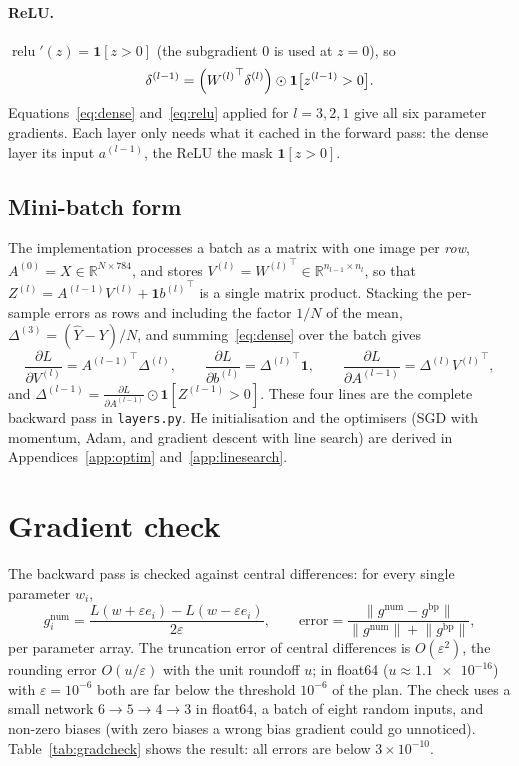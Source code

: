 \documentclass[11pt,a4paper]{article}
\newcommand{\R}{\mathbb{R}}
\newcommand{\1}{\mathbf{1}}
\begin{document}
\paragraph{ReLU.} $\operatorname{relu}'(z) = \1[z > 0]$ (the subgradient $0$ is used at
$z = 0$), so
\begin{equation}
  \delta^{(l-1)} = \Bigl({W^{(l)}}^{\top} \delta^{(l)}\Bigr) \odot \1\bigl[z^{(l-1)} > 0\bigr].
  \label{eq:relu}
\end{equation}
Equations~\eqref{eq:dense} and~\eqref{eq:relu} applied for $l = 3, 2, 1$ give all six parameter
gradients. Each layer only needs what it cached in the forward pass: the dense layer its input
$a^{(l-1)}$, the ReLU the mask $\1[z > 0]$.

\subsection{Mini-batch form}
The implementation processes a batch as a matrix with one image per \emph{row},
$A^{(0)} = X \in \R^{N \times 784}$, and stores $V^{(l)} = {W^{(l)}}^{\top} \in
\R^{n_{l-1} \times n_l}$, so that $Z^{(l)} = A^{(l-1)} V^{(l)} + \1 {b^{(l)}}^{\top}$ is a single
matrix product. Stacking the per-sample errors as rows and including the factor $1/N$ of the mean,
$\Delta^{(3)} = (\hat Y - Y)/N$, and summing~\eqref{eq:dense} over the batch gives
\begin{equation}
  \frac{\partial L}{\partial V^{(l)}} = {A^{(l-1)}}^{\top} \Delta^{(l)}, \qquad
  \frac{\partial L}{\partial b^{(l)}} = {\Delta^{(l)}}^{\top} \1, \qquad
  \frac{\partial L}{\partial A^{(l-1)}} = \Delta^{(l)} {V^{(l)}}^{\top},
\end{equation}
and $\Delta^{(l-1)} = \frac{\partial L}{\partial A^{(l-1)}} \odot \1[Z^{(l-1)} > 0]$. These four
lines are the complete backward pass in \texttt{layers.py}. He initialisation and the
optimisers (SGD with momentum, Adam, and gradient descent with line search) are derived in
Appendices~\ref{app:optim} and~\ref{app:linesearch}.

\section{Gradient check}
\label{sec:gradcheck}

The backward pass is checked against central differences: for every single parameter $w_i$,
\begin{equation}
  g^{\text{num}}_i = \frac{L(w + \varepsilon e_i) - L(w - \varepsilon e_i)}{2 \varepsilon},
  \qquad
  \text{error} = \frac{\lVert g^{\text{num}} - g^{\text{bp}} \rVert}
                      {\lVert g^{\text{num}} \rVert + \lVert g^{\text{bp}} \rVert},
\end{equation}
per parameter array. The truncation error of central differences is $O(\varepsilon^2)$, the
rounding error $O(u/\varepsilon)$ with the unit roundoff $u$; in float64 ($u \approx
\num{1.1e-16}$) with $\varepsilon = 10^{-6}$ both are far below the threshold $10^{-6}$ of the
plan. The check uses a small network $6 \to 5 \to 4 \to 3$ in float64, a batch of eight random
inputs, and non-zero biases (with zero biases a wrong bias gradient could go unnoticed).
Table~\ref{tab:gradcheck} shows the result: all errors are below $3 \times 10^{-10}$.
\end{document}
